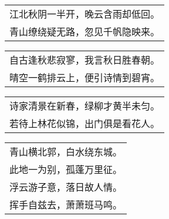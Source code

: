 \noindent\begin{minipage}{\linewidth}
  \vskip-3pt\begin{table}[H]
    \centering
    \begin{tabular}{@{}l@{}}
江北秋阴一半开，晚云含雨却低回。\\
青山缭绕疑无路，忽见千帆隐映来。
    \end{tabular}
  \end{table}
\end{minipage}
\vspace{1cm}


\noindent\begin{minipage}{\linewidth}
  \vskip-3pt\begin{table}[H]
    \centering
    \begin{tabular}{@{}l@{}}
自古逢秋悲寂寥，我言秋日胜春朝。\\
晴空一鹤排云上，便引诗情到碧宵。
    \end{tabular}
  \end{table}
\end{minipage}
\vspace{1cm}


\noindent\begin{minipage}{\linewidth}
  \vskip-3pt\begin{table}[H]
    \centering
    \begin{tabular}{@{}l@{}}
诗家清景在新春，绿柳才黄半未匀。\\
若待上林花似锦，出门俱是看花人。
    \end{tabular}
  \end{table}
\end{minipage}
\vspace{1cm}


\noindent\begin{minipage}{\linewidth}
  \vskip-3pt\begin{table}[H]
    \centering
    \begin{tabular}{@{}l@{}}
青山横北郭，白水绕东城。\\
此地一为别，孤蓬万里征。\\
浮云游子意，落日故人情。\\
挥手自兹去，萧萧班马鸣。
    \end{tabular}
  \end{table}
\end{minipage}
\vspace{1cm}


